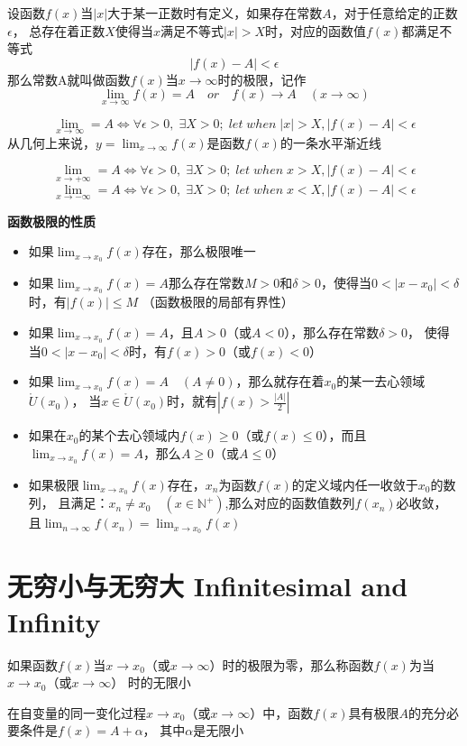 \documentclass[UTF8]{ctexart}
\begin{document}
设函数$f(x)$当$|x|$大于某一正数时有定义，如果存在常数$A$，对于任意给定的正数$\epsilon$，
总存在着正数$X$使得当$x$满足不等式$|x|>X$时，对应的函数值$f(x)$都满足不等式
\[
  |f(x)-A|<\epsilon
\]
那么常数A就叫做函数$f(x)$当$x\to\infty$时的极限，记作
\[
  \lim_{x\to\infty}f(x)=A\quad or \quad f(x)\to A\quad(x\to\infty)
\]

\[
  \lim_{x\to\infty}=A\iff\forall\epsilon>0,\;\exists X>0;\;let\;when\;|x|>X,|f(x)-A|<\epsilon
\]
从几何上来说，$y=\lim_{x\to\infty}f(x)$是函数$f(x)$的一条水平渐近线

\[
  \lim_{x\to+\infty}=A\iff\forall\epsilon>0,\;\exists X>0;\;let\;when\;x>X,|f(x)-A|<\epsilon
\]
\[
  \lim_{x\to-\infty}=A\iff\forall\epsilon>0,\;\exists X>0;\;let\;when\;x<X,|f(x)-A|<\epsilon
\]

\bigskip

\textbf{函数极限的性质}
\begin{itemize}
  \item 如果$\lim_{x\to x_0}f(x)$存在，那么极限唯一
  \item 如果$\lim_{x\to x_0}f(x)=A$那么存在常数$M>0$和$\delta>0$，使得当$0<|x-x_0|<\delta$时，有$|f(x)|\le M$
  （函数极限的局部有界性）
  \item 如果$\lim_{x\to x_0}f(x)=A$，且$A>0$（或$A<0$），那么存在常数$\delta>0$，
  使得当$0<|x-x_0|<\delta$时，有$f(x)>0$（或$f(x)<0$）
  \item 如果$\lim_{x\to x_0}f(x)=A\quad(A\ne0)$，那么就存在着$x_0$的某一去心领域$\mathring{U}(x_0)$，
  当$x\in\mathring{U}(x_0)$时，就有$|f(x)>\frac{|A|}{2}|$
  \item 如果在$x_0$的某个去心领域内$f(x)\ge0$（或$f(x)\le0$），而且$\lim_{x\to x_0}f(x)=A$，那么$A\ge0$（或$A\le0$）
  \item 如果极限$\lim_{x\to x_0}f(x)$存在，${x_n}$为函数$f(x)$的定义域内任一收敛于$x_0$的数列，
  且满足：$x_n\ne x_0\quad (x\in\mathbb{N}^+)$,那么对应的函数值数列${f(x_n)}$必收敛，
  且$\lim_{n\to\infty}f(x_n)=\lim_{x\to x_0}f(x)$
\end{itemize}
\bigskip
\bigskip
\section*{无穷小与无穷大 Infinitesimal and Infinity}

\bigskip

如果函数$f(x)$当$x\to x_0$（或$x\to\infty$）时的极限为零，那么称函数$f(x)$为当$x\to x_0$（或$x\to\infty$）
时的无限小

\bigskip

在自变量的同一变化过程$x\to x_0$（或$x\to\infty$）中，函数$f(x)$具有极限$A$的充分必要条件是$f(x)=A+\alpha$，
其中$\alpha$是无限小
\end{document}
